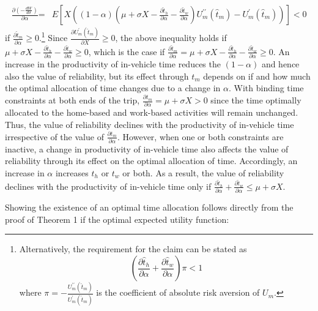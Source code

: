 \documentclass[12pt,a4paper,british]{article}
\makeatletter
\theoremstyle{definition}
\theoremstyle{plain}
\newenvironment{proof}[1][\proofname]{\par
    \normalfont\topsep6\p@\@plus6\p@\relax
    \trivlist
    \itemindent\parindent
    \item[\hskip\labelsep
          \scshape
      #1]\ignorespaces
  }{%
    \endtrivlist\@endpefalse
  }
\providecommand{\proofname}{Proof}
\theoremstyle{plain}
\makeatother
\begin{document}
\begin{proof}
\begin{align*}
\frac{\partial\left(-\frac{dW}{d\sigma}\right)}{\partial\alpha}\text{=} & E\left[X\left(\left(1-\alpha\right)\left(\mu+\sigma X-\frac{\partial\hat{t}_{h}}{\partial\alpha}-\frac{\partial\hat{t}_{w}}{\partial\alpha}\right)U_{m}^{\prime\prime}\left(\hat{t}_{m}\right)-U_{m}^{\prime}\left(\hat{t}_{m}\right)\right)\right]<0
\end{align*}
if $\frac{\partial\hat{t}_{m}}{\partial\alpha}\geq0$.\footnote{Alternatively, the requirement for the claim can be stated as 
\[
\left(\frac{\partial\hat{t}_{h}}{\partial\alpha}+\frac{\partial\hat{t}_{w}}{\partial\alpha}\right)\pi<1
\]
where $\pi=-\frac{U_{m}^{\prime\prime}\left(\hat{t}_{m}\right)}{U_{m}^{\prime}\left(\hat{t}_{m}\right)}$
is the coefficient of absolute risk aversion of $U_{m}$.} Since $\frac{\partial U_{m}^{\prime}\left(\hat{t}_{m}\right)}{\partial X}\geq0$,
the above inequality holds if $\mu+\sigma X-\frac{\partial\hat{t}_{h}}{\partial\alpha}-\frac{\partial\hat{t}_{w}}{\partial\alpha}\geq0$,
which is the case if $\frac{\partial\hat{t}_{m}}{\partial\alpha}=\mu+\sigma X-\frac{\partial\hat{t}_{h}}{\partial\alpha}-\frac{\partial\hat{t}_{w}}{\partial\alpha}\geq0$.
\end{proof}
An increase in the productivity of in-vehicle time reduces the $\left(1-\alpha\right)$
and hence also the value of reliability, but its effect through $t_{m}$
depends on if and how much the optimal allocation of time changes
due to a change in $\alpha$. With binding time constraints at both
ends of the trip, $\frac{\partial t_{m}}{\partial\alpha}=\mu+\sigma X>0$
since the time optimally allocated to the home-based and work-based
activities will remain unchanged. Thus, the value of reliability declines
with the productivity of in-vehicle time irrespective of the value
of $\frac{\partial t_{m}}{\partial\alpha}$. However, when one or
both constraints are inactive, a change in productivity of in-vehicle
time also affects the value of reliability through its effect on the
optimal allocation of time. Accordingly, an increase in $\alpha$
increases $t_{h}$ or $t_{w}$ or both. As a result, the value of
reliability declines with the productivity of in-vehicle time only
if $\frac{\partial\hat{t}_{h}}{\partial\alpha}+\frac{\partial\hat{t}_{w}}{\partial\alpha}\leq\mu+\sigma X$.

\clearpage{}

Showing the existence of an optimal time allocation follows directly
from the proof of Theorem 1 if the optimal expected utility function:
\end{document}
